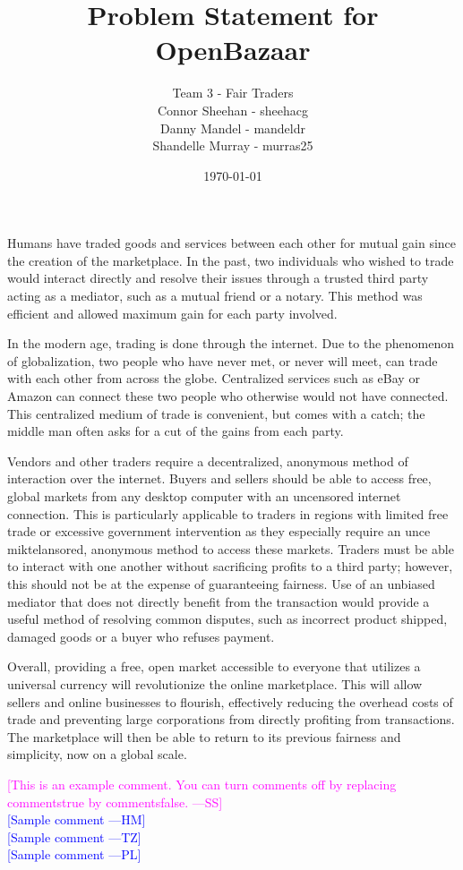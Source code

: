 \documentclass[12pt]{report}
\newcommand{\authornote}[3]{\textcolor{#1}{[#3 ---#2]}}
\newcommand{\authornote}[3]{}
\newcommand{\wss}[1]{\authornote{magenta}{SS}{#1}}
\newcommand{\hm}[1]{\authornote{blue}{HM}{#1}} %
\newcommand{\tz}[1]{\authornote{blue}{TZ}{#1}} %
\newcommand{\pl}[1]{\authornote{blue}{PL}{#1}} %
\begin{document}
\title{Problem Statement for OpenBazaar} 
\author{Team 3 - Fair Traders \\ Connor Sheehan - sheehacg \\Danny Mandel - mandeldr \\ Shandelle Murray - murras25}
\date{\today}
	
\maketitle

Humans have traded goods and services between each other for mutual gain since the creation of the marketplace. In the past, two individuals who wished to trade would interact directly and resolve their issues through a trusted third party acting as a mediator, such as a mutual friend or a notary. This method was efficient and allowed maximum gain for each party involved. 
	
In the modern age, trading is done through the internet. Due to the phenomenon of globalization, two people who have never met, or never will meet, can trade with each other from across the globe. Centralized services such as eBay or Amazon can connect these two people who otherwise would not have connected. This centralized medium of trade is convenient, but comes with a catch; the middle man often asks for a cut of the gains from each party. 

Vendors and other traders require a decentralized, anonymous method of interaction over the internet. Buyers and sellers should be able to access free, global markets from any desktop computer with an uncensored internet connection. This is particularly applicable to traders in regions with limited free trade or excessive government intervention as they especially require an unce miktelansored, anonymous method to access these markets. Traders must be able to interact with one another without sacrificing profits to a third party; however, this should not be at the expense of guaranteeing fairness. Use of an unbiased mediator that does not directly benefit from the transaction would provide a useful method of resolving common disputes, such as incorrect product shipped, damaged goods or a buyer who refuses payment.
	
Overall, providing a free, open market accessible to everyone that utilizes a universal currency will revolutionize the online marketplace. This will allow sellers and online businesses to flourish, effectively reducing the overhead costs of trade and preventing large corporations from directly profiting from transactions. The marketplace will then be able to return to its previous fairness and simplicity, now on a global scale.


\noindent \wss{This is an example comment.  You can turn comments off by replacing
  commentstrue by commentsfalse.}\\
\hm{Sample comment}\\
\tz{Sample comment}\\
\pl{Sample comment}
\end{document}
